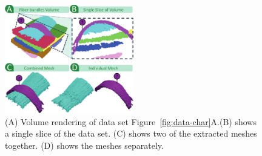 \begin{figure}
\centering
		\includegraphics[width=0.5\textwidth]{imagesMT2014/figure7.pdf}
	\caption{(A) Volume rendering of data set Figure~\ref{fig:data-char}A.(B) shows a single slice of the data set. (C) shows two of the extracted meshes together. (D) shows the meshes separately.}
	\label{fig:crop-16-decomp}
\end{figure}  
  
